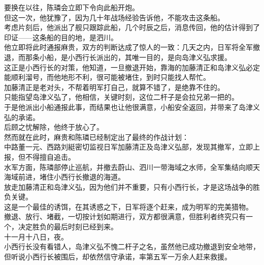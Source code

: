 \begin{multicols}{\theparacolNo}
要换在以往，陈璘会立即下令向此船开炮。\\

但这一次，他犹豫了，因为几十年战场经验告诉他，不能攻击这条船。\\

考虑片刻后，他派出了舰只跟踪此船，几个时辰之后，消息传回，他的估计得到了印证——这条船的目的地，是泗川。\\

他立即将此时通报麻贵，双方的判断达成了惊人的一致：几天之内，日军将全军撤退，而那条小船，是小西行长派出的，其唯一目的，是向岛津义弘求援。\\

这正是小西行长的对策，他知道，一旦撤退开始，靠海的加藤清正和岛津义弘必定能顺利溜号，而他地形不利，很可能被堵住，到时只能找人帮忙。\\

加藤清正是老对头，不帮着明军打自己，就算不错了，是绝靠不住的。\\

只能指望岛津义弘了，他相信，关键时刻，这位二杆子是会拉兄弟一把的。\\

于是他派出小船通报此事，而结果也让他很满意，小船安全返回，并带来了岛津义弘的承诺。\\

后顾之忧解除，他终于放心了。\\

然而就在此时，麻贵和陈璘已经制定出了最终的作战计划：\\

中路董一元、西路刘綎密切监视日军加藤清正及岛津义弘部，发现其撤军，立即上报，但不得擅自追击。\\

水军方面，陈璘部停止巡航，并撤去蔚山、泗川一带海域之水师，全军集结向顺天海域前进，堵住小西行长撤退的海道。\\

放走加藤清正和岛津义弘，因为他们并不重要，只有小西行长，才是这场战争的胜负关键。\\

这是一个最佳的诱饵，在其诱惑之下，日军将逐个赶来，成为明军的完美猎物。\\

撤退、放行、堵截，一切按计划如期进行，双方都很满意，但胜利者终究只有一个，决定胜负的最后时刻已经到来。\\

十一月十八日，夜。\\

小西行长没有看错人，岛津义弘不愧二杆子之名，虽然他已成功撤退到安全地带，但听说小西行长被围后，却依然信守承诺，率第五军一万余人赶来救援。\\


\end{multicols}
